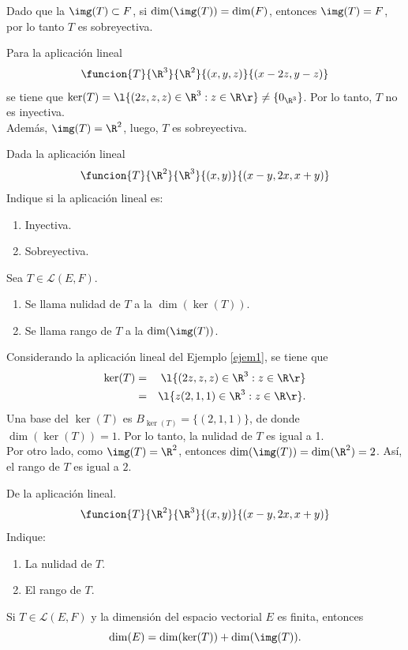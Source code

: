 \documentclass[compacto,10pt]{pubciencias-notas}
\begin{document}
\begin{obs}
Dado que la $\img(T)\subset F$, si $\dim(\img(T))=\dim(F)$, entonces $\img(T)=F$, por lo tanto $T$ es sobreyectiva.
\end{obs}
\begin{ejem}\label{ejem1}
Para la aplicaci\'on lineal 
\[
 \funcion{T}{\R^3}{\R^2}{(x,y,z)}{(x-2z,y-z)}
\]
se tiene que $\ker(T)=\l\{(2z,z,z)\in \R^3:z\in\R\r\}\neq\{0_{\R^3}\}$. Por lo tanto, $T$ no es inyectiva.\\
Además, $\img(T) =\R^2$, luego, $T$ es sobreyectiva.
\end{ejem}
\begin{ejer}\label{ejer1}
Dada la aplicaci\'on lineal 
\[
 \funcion{T}{\R^2}{\R^3}{(x,y)}{(x-y,2x,x+y)}
\]
Indique si la aplicaci\'on lineal es:
\begin{enumerate}
\item[$a)$] Inyectiva.
\item[$b)$] Sobreyectiva.
\end{enumerate}
\end{ejer}
\begin{defi}
    Sea $T \in \mathscr{L}(E,F)$.
    \begin{enumerate}
    \item 
        Se llama nulidad de $T$ a la $\dim(\ker(T))$.
    \item 
        Se llama rango de $T$ a la $\dim(\img(T))$.
    \end{enumerate}
\end{defi}
\begin{ejem}\hspace{0pt}\label{NulidadRango}\label{ejem2}
Considerando la aplicación lineal del Ejemplo \ref{ejem1}, se tiene que 
\begin{eqnarray*}
 \ker(T)&=&\l\{(2z,z,z)\in \R^3:z\in\R\r\}\\
 &=&\l\{z(2,1,1)\in \R^3:z\in\R\r\}.
\end{eqnarray*}
Una base del $\ker(T)$ es $B_{\ker(T)}=\{(2,1,1)\}$, de donde $\dim(\ker(T))=1$. Por lo tanto, la nulidad de $T$ es igual a 1.\\
Por otro lado, como $\img(T)=\R^2$,  entonces $\dim(\img(T))=\dim(\R^2)=2$. As\'i, el rango de $T$ es igual a $2$.
\end{ejem}

\begin{ejer}
De la aplicación lineal.
\[
 \funcion{T}{\R^2}{\R^3}{(x,y)}{(x-y,2x,x+y)}
\] Indique:
\begin{enumerate}
    \item[$a)$] La nulidad de $T$.
    \item[$b)$] El rango de $T$.
\end{enumerate}
\end{ejer}
\begin{teo}
    Si $T \in \mathscr{L}(E,F)$ y la dimensión del espacio vectorial $E$ es finita, entonces
    \[
        \dim(E) = \dim(\ker(T)) +  \dim(\img(T)).
    \]
\end{teo}  
\end{document}
